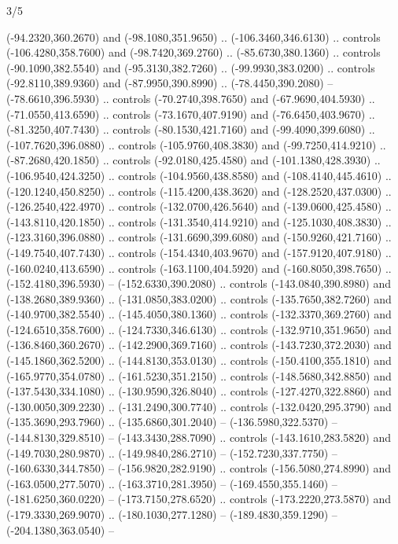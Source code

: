 \begin{flagdescription}{3/5}
\begin{scope}[xshift=0.5\flaglength,yshift=0.5\flagwidth,scale=\flagwidth/525.28]
\begin{scope}[y=0.8pt, x=0.8pt, yscale=-1,shift={(-486,-300)}]
\begin{scope}[draw=black,even odd rule]
  (-94.2320,360.2670) and (-98.1080,351.9650) .. (-106.3460,346.6130) ..
  controls (-106.4280,358.7600) and (-98.7420,369.2760) .. (-85.6730,380.1360)
  .. controls (-90.1090,382.5540) and (-95.3130,382.7260) .. (-99.9930,383.0200)
  .. controls (-92.8110,389.9360) and (-87.9950,390.8990) .. (-78.4450,390.2080)
  -- (-78.6610,396.5930) .. controls (-70.2740,398.7650) and (-67.9690,404.5930)
  .. (-71.0550,413.6590) .. controls (-73.1670,407.9190) and (-76.6450,403.9670)
  .. (-81.3250,407.7430) .. controls (-80.1530,421.7160) and (-99.4090,399.6080)
  .. (-107.7620,396.0880) .. controls (-105.9760,408.3830) and
  (-99.7250,414.9210) .. (-87.2680,420.1850) .. controls (-92.0180,425.4580) and
  (-101.1380,428.3930) .. (-106.9540,424.3250) .. controls (-104.9560,438.8580)
  and (-108.4140,445.4610) .. (-120.1240,450.8250) .. controls
  (-115.4200,438.3620) and (-128.2520,437.0300) .. (-126.2540,422.4970) ..
  controls (-132.0700,426.5640) and (-139.0600,425.4580) .. (-143.8110,420.1850)
  .. controls (-131.3540,414.9210) and (-125.1030,408.3830) ..
  (-123.3160,396.0880) .. controls (-131.6690,399.6080) and (-150.9260,421.7160)
  .. (-149.7540,407.7430) .. controls (-154.4340,403.9670) and
  (-157.9120,407.9180) .. (-160.0240,413.6590) .. controls (-163.1100,404.5920)
  and (-160.8050,398.7650) .. (-152.4180,396.5930) -- (-152.6330,390.2080) ..
  controls (-143.0840,390.8980) and (-138.2680,389.9360) .. (-131.0850,383.0200)
  .. controls (-135.7650,382.7260) and (-140.9700,382.5540) ..
  (-145.4050,380.1360) .. controls (-132.3370,369.2760) and (-124.6510,358.7600)
  .. (-124.7330,346.6130) .. controls (-132.9710,351.9650) and
  (-136.8460,360.2670) .. (-142.2900,369.7160) .. controls (-143.7230,372.2030)
  and (-145.1860,362.5200) .. (-144.8130,353.0130) .. controls
  (-150.4100,355.1810) and (-165.9770,354.0780) .. (-161.5230,351.2150) ..
  controls (-148.5680,342.8850) and (-137.5430,334.1080) .. (-130.9590,326.8040)
  .. controls (-127.4270,322.8860) and (-130.0050,309.2230) ..
  (-131.2490,300.7740) .. controls (-132.0420,295.3790) and (-135.3690,293.7960)
  .. (-135.6860,301.2040) -- (-136.5980,322.5370) -- (-144.8130,329.8510) --
  (-143.3430,288.7090) .. controls (-143.1610,283.5820) and (-149.7030,280.9870)
  .. (-149.9840,286.2710) -- (-152.7230,337.7750) -- (-160.6330,344.7850) --
  (-156.9820,282.9190) .. controls (-156.5080,274.8990) and (-163.0500,277.5070)
  .. (-163.3710,281.3950) -- (-169.4550,355.1460) -- (-181.6250,360.0220) --
  (-173.7150,278.6520) .. controls (-173.2220,273.5870) and (-179.3330,269.9070)
  .. (-180.1030,277.1280) -- (-189.4830,359.1290) -- (-204.1380,363.0540) --

\end{scope}
\end{scope}
\end{scope}
\end{flagdescription}
